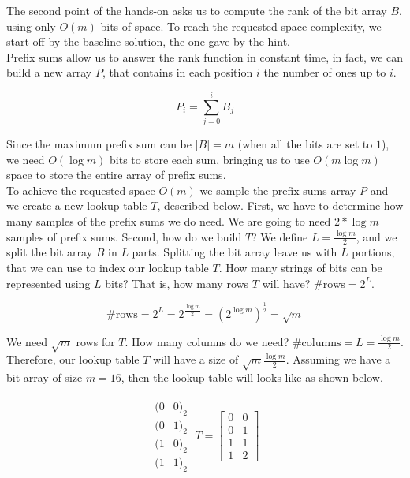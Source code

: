 \documentclass{article}
\begin{document}
The second point of the hands-on asks us to compute the rank of the bit array $B$, using only $O(m)$ bits of space. To reach the requested space complexity,
we start off by the baseline solution, the one gave by the hint.\\

\noindent Prefix sums allow us to answer the rank function in constant time, in fact, we can build a new array $P$, that contains in each position $i$ the number of ones
up to $i$.

\begin{equation}
    P_i = \sum_{j = 0}^{i} B_j
\end{equation}

\noindent Since the maximum prefix sum can be $|B| = m$ (when all the bits are set to $1$), we need $O(\log m)$ bits to store each sum, bringing us to use
$O(m \log m)$ space to store the entire array of prefix sums.\\

\noindent To achieve the requested space $O(m)$ we sample the prefix sums array $P$ and we create a new lookup table $T$, described below. First, we have to determine how many samples
of the prefix sums we do need. We are going to need $2 * \log m$ samples of prefix sums. Second, how do we build $T$? We define $L = \frac{\log m}{2}$, and we split the bit array $B$
in $L$ parts. Splitting the bit array leave us with $L$ portions, that we can use to index our lookup table $T$. 
How many strings of bits can be represented using $L$ bits? That is, how many rows $T$ will have? $\#\textrm{rows} = 2^L$.

\begin{equation}
    \textrm{\#rows} = 2^L = 2^{\frac{\log m}{2}} = (2^{\log m})^{\frac{1}{2}} = \sqrt m
\end{equation}

\noindent We need $\sqrt m$ rows for $T$. How many columns do we need? $\# \textrm{columns} = L = \frac{\log m}{2}$. Therefore, our lookup table $T$ will have a size of $\sqrt m \frac{\log m}{2}$. Assuming we have a bit array of size 
$m = 16$, then the lookup table will looks like as shown below.

\begin{align}
     \begin{matrix}
         (0 & 0)_2 \\
         (0 & 1)_2 \\
         (1 & 0)_2 \\
         (1 & 1)_2 
     \end{matrix} \;
     T = 
     \begin{bmatrix}
        0 & 0 \\
        0 & 1 \\
        1 & 1 \\
        1 & 2
    \end{bmatrix} 
\end{align}
\end{document}
